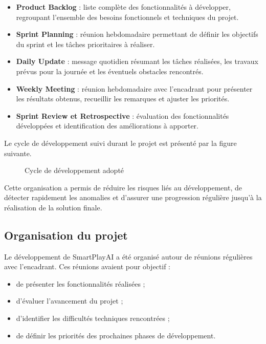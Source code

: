 \begin{itemize}
\begin{itemize}
    \item \textbf{Product Backlog} : liste complète des fonctionnalités à développer, regroupant l’ensemble des besoins fonctionnels et techniques du projet.
    \item \textbf{Sprint Planning} : réunion hebdomadaire permettant de définir les objectifs du sprint et les tâches prioritaires à réaliser.
    \item \textbf{Daily Update} : message quotidien résumant les tâches réalisées, les travaux prévus pour la journée et les éventuels obstacles rencontrés.
    \item \textbf{Weekly Meeting} : réunion hebdomadaire avec l’encadrant pour présenter les résultats obtenus, recueillir les remarques et ajuster les priorités.
    \item \textbf{Sprint Review et Retrospective} : évaluation des fonctionnalités développées et identification des améliorations à apporter.
\end{itemize}

Le cycle de développement suivi durant le projet est présenté par la figure suivante.

\begin{figure}[H]
    \centering
    \caption{Cycle de développement adopté}
    \label{fig:scrum_cycle}
\end{figure}

Cette organisation a permis de réduire les risques liés au développement, de détecter rapidement les anomalies et d'assurer une progression régulière jusqu'à la réalisation de la solution finale.

\subsection{Organisation du projet}
Le développement de SmartPlayAI a été organisé autour de réunions régulières avec l'encadrant. Ces réunions avaient pour objectif :

\begin{itemize}
    \item de présenter les fonctionnalités réalisées ;
    \item d'évaluer l'avancement du projet ;
    \item d'identifier les difficultés techniques rencontrées ;
    \item de définir les priorités des prochaines phases de développement.
\end{itemize}


\end{itemize}
